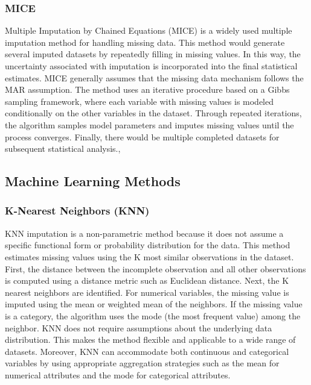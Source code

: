 \documentclass[twocolumn, 9pt]{extarticle}
\begin{document}
\subsubsection{MICE}

Multiple Imputation by Chained Equations (MICE) is a widely used multiple imputation method for handling missing data. This method would  generate several imputed datasets by repeatedly filling in missing values. In this way, the uncertainty associated with imputation is incorporated into the final statistical estimates. MICE generally assumes that the missing data mechanism follows the MAR assumption.\cite{azur2011multiple} The method uses an iterative procedure based on a Gibbs sampling framework, where each variable with missing values is modeled conditionally on the other variables in the dataset. Through repeated iterations, the algorithm samples model parameters and imputes missing values until the process converges. Finally,  there would be multiple completed datasets for subsequent statistical analysis.\cite{sun2023deep},\cite{azur2011multiple}

\subsection{Machine Learning Methods}  
\subsubsection{K-Nearest Neighbors (KNN)}
KNN imputation is a non-parametric method because it does not assume a specific functional form or probability distribution for the data. This method estimates missing values using the K most similar observations in the dataset. First, the distance between the incomplete observation and all other observations is computed using a distance metric such as Euclidean distance. Next, the K nearest neighbors are identified. For numerical variables, the missing value is imputed using the mean or weighted mean of the neighbors. If the missing value is a category, the algorithm uses the mode (the most frequent value) among the neighbor\cite{popovich2025treat}. KNN does not require assumptions about the underlying data distribution. This makes the method flexible and applicable to a wide range of datasets. Moreover, KNN can accommodate both continuous and categorical variables by using appropriate aggregation strategies such as the mean for numerical attributes and the mode for categorical attributes\cite{popovich2025treat}. 
\end{document}
